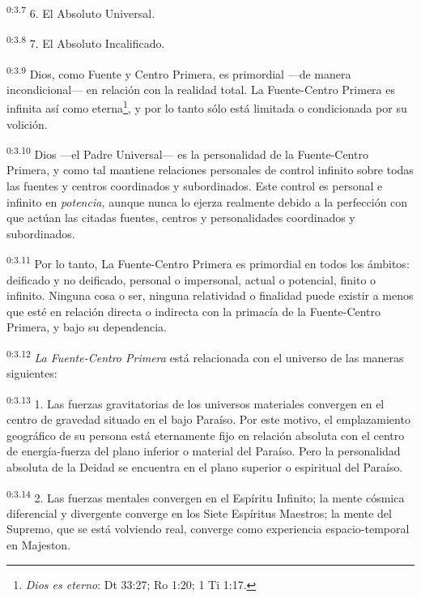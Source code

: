 \par
\textsuperscript{0:3.7} 6. El Absoluto Universal.

\par
\textsuperscript{0:3.8} 7. El Absoluto Incalificado.

\par
\textsuperscript{0:3.9} Dios, como Fuente y Centro Primera, es primordial ---de manera incondicional--- en relación con la realidad total. La Fuente-Centro Primera es infinita así como eterna\footnote{\textit{Dios es eterno}: Dt 33:27; Ro 1:20; 1 Ti 1:17.}, y por lo tanto sólo está limitada o condicionada por su volición.

\par
\textsuperscript{0:3.10} Dios ---el Padre Universal--- es la personalidad de la Fuente-Centro Primera, y como tal mantiene relaciones personales de control infinito sobre todas las fuentes y centros coordinados y subordinados. Este control es personal e infinito en \textit{potencia,} aunque nunca lo ejerza realmente debido a la perfección con que actúan las citadas fuentes, centros y personalidades coordinados y subordinados.

\par
\textsuperscript{0:3.11} Por lo tanto, La Fuente-Centro Primera es primordial en todos los ámbitos: deificado y no deificado, personal o impersonal, actual o potencial, finito o infinito. Ninguna cosa o ser, ninguna relatividad o finalidad puede existir a menos que esté en relación directa o indirecta con la primacía de la Fuente-Centro Primera, y bajo su dependencia.

\par
\textsuperscript{0:3.12} \textit{La Fuente-Centro Primera} está relacionada con el universo de las maneras siguientes:

\par
\textsuperscript{0:3.13} 1. Las fuerzas gravitatorias de los universos materiales convergen en el centro de gravedad situado en el bajo Paraíso. Por este motivo, el emplazamiento geográfico de su persona está eternamente fijo en relación absoluta con el centro de energía-fuerza del plano inferior o material del Paraíso. Pero la personalidad absoluta de la Deidad se encuentra en el plano superior o espiritual del Paraíso.

\par
\textsuperscript{0:3.14} 2. Las fuerzas mentales convergen en el Espíritu Infinito; la mente cósmica diferencial y divergente converge en los Siete Espíritus Maestros; la mente del Supremo, que se está volviendo real, converge como experiencia espacio-temporal en Majeston.

